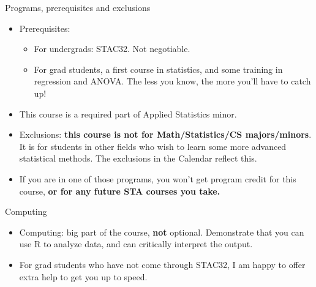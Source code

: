 \documentclass[unknownkeysallowed]{beamer}\usepackage[]{graphicx}\usepackage[]{color}
\begin{document}
\begin{frame}[fragile]{Programs, prerequisites and exclusions}

  \begin{itemize}
  \item Prerequisites:
      \begin{itemize}
      \item For undergrads: STAC32. Not negotiable.
    \item  For grad students,
      a first course in statistics, and some training in
      regression and ANOVA. The less you know, the more you'll have to
      catch up!
      \end{itemize}

    \item This course is a required part of Applied Statistics minor.
    \item Exclusions: \textbf{this course is not for
        Math/Statistics/CS majors/minors}. It is for students in other
      fields who wish to learn some more advanced statistical
      methods. The exclusions in the Calendar reflect this. 
    \item If you
      are in one of those programs, you won't get program credit for
      this course, \textbf{or for any future STA courses you take.}

  \end{itemize}
  
\end{frame}


\begin{frame}[fragile]{Computing}

  \begin{itemize}
  \item Computing: big part of the course, {\bf not}
    optional. Demonstrate that you can use 
    R to analyze data, and can
    critically interpret the output.
  \item For grad students who have not come through STAC32, I am happy
    to offer extra help to get you up to speed.
  \end{itemize}
  
\end{frame}
\end{document}
